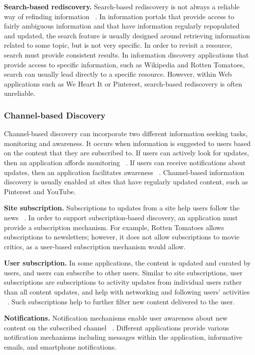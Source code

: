 \documentclass{casconpaper}
\begin{document}
{{\textbf{Search-based rediscovery.} Search-based rediscovery is not always a reliable way of refinding information ~\cite{cockburn}. In information portals that provide access to fairly ambiguous information and that have information regularly repopulated and updated, the search feature is usually designed around retrieving information related to some topic, but is not very specific. In order to revisit a resource, search must provide consistent results. In information discovery applications that provide access to specific information, such as Wikipedia and Rotten Tomatoes, search can usually lead directly to a specific resource. However, within Web applications such as We Heart It or Pinterest, search-based rediscovery is often unreliable.

} %

{\subsubsection{Channel-based Discovery}
Channel-based discovery can incorporate two different information seeking tasks, monitoring and awareness. It occurs when information is suggested to users based on the content that they are subscribed to. If users can actively look for updates, then an application affords monitoring ~\cite{morrison}. If users can receive notifications about updates, then an application facilitates awareness ~\cite{bates2002, bates1986}. Channel-based information discovery is usually enabled at sites that have regularly updated content, such as Pinterest and YouTube.                            


\textbf{Site subscription.} Subscriptions to updates from a site help users follow the news ~\cite{java}. In order to support subscription-based discovery, an application must provide a subscription mechanism. For example, Rotten Tomatoes allows subscriptions to newsletters; however, it does not allow subscriptions to movie critics, as a user-based subscription mechanism would allow. 

\textbf{User subscription.} In some applications, the content is updated and curated by users, and users can subscribe to other users. Similar to site subscriptions, user subscriptions are subscriptions to activity updates from individual users rather than all content updates, and help with networking and following users' activities ~\cite{millen}. Such subscriptions help to further filter new content delivered to the user. 

\textbf{Notifications.} Notification mechanisms enable user awareness about new content on the subscribed channel ~\cite{millen}. Different applications provide various notification mechanisms including messages within the application, informative emails, and smartphone notifications.

}}
\end{document}
